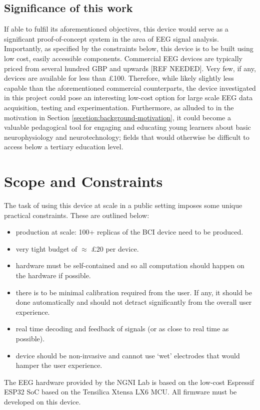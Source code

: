 \subsection{Significance of this work}
If able to fulfil its aforementioned objectives, this device would serve as a significant proof-of-concept system in the area of EEG signal analysis. Importantly, as specified by the constraints below, this device is to be built using low cost, easily accessible components. Commercial EEG devices are typically priced from several hundred GBP and upwards [REF NEEDED]. Very few, if any, devices are available for less than £100. Therefore, while likely slightly less capable than the aforementioned commercial counterparts, the device investigated in this project could pose an interesting low-cost option for large scale EEG data acquisition, testing and experimentation. Furthermore, as alluded to in the motivation in Section \ref{secetion:background-motivation}, it could become a valuable pedagogical tool for engaging and educating young learners about basic neurophysiology and neurotechnology; fields that would otherwise be difficult to access below a tertiary education level.


\section{Scope and Constraints}
\label{section:scope-constraints-intro}
The task of using this device at scale in a public setting imposes some unique practical constraints. These are outlined below:
\begin{itemize}
    \item production at scale: 100+ replicas of the BCI device need to be produced.
    \item very tight budget of $\approx$ £20 per device.
    \item hardware must be self-contained and so all computation should happen on the hardware if possible. 
    \item there is to be minimal calibration required from the user. If any, it should be done automatically and should not detract significantly from the overall user experience.
    \item real time decoding and feedback of signals (or as close to real time as possible).
    \item device should be non-invasive and cannot use `wet' electrodes that would hamper the user experience.
\end{itemize}
The EEG hardware provided by the NGNI Lab is based on the low-cost Espressif ESP32 SoC based on the Tensilica Xtensa LX6 MCU. All firmware must be developed on this device.

